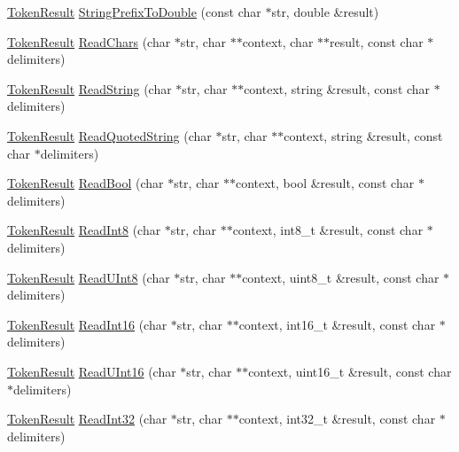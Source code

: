 \begin{DoxyCompactItemize}
\hyperlink{namespacemage_a2178ba2411db5912f41b2e7698c2037d}{Token\+Result} \hyperlink{namespacemage_a289525f635f3921024dd10dd6073a555}{String\+Prefix\+To\+Double} (const char $\ast$str, double \&result)
\item 
\hyperlink{namespacemage_a2178ba2411db5912f41b2e7698c2037d}{Token\+Result} \hyperlink{namespacemage_a5f2717cd5b7cfa9a43396e628e18a5d0}{Read\+Chars} (char $\ast$str, char $\ast$$\ast$context, char $\ast$$\ast$result, const char $\ast$delimiters)
\item 
\hyperlink{namespacemage_a2178ba2411db5912f41b2e7698c2037d}{Token\+Result} \hyperlink{namespacemage_aa4f9ae6b6aa815ab879d4ea1f0453172}{Read\+String} (char $\ast$str, char $\ast$$\ast$context, string \&result, const char $\ast$delimiters)
\item 
\hyperlink{namespacemage_a2178ba2411db5912f41b2e7698c2037d}{Token\+Result} \hyperlink{namespacemage_a0d98db3ab52b137bc811727c68659329}{Read\+Quoted\+String} (char $\ast$str, char $\ast$$\ast$context, string \&result, const char $\ast$delimiters)
\item 
\hyperlink{namespacemage_a2178ba2411db5912f41b2e7698c2037d}{Token\+Result} \hyperlink{namespacemage_af0a37dab7ba4c58335ff1e84d7279c1c}{Read\+Bool} (char $\ast$str, char $\ast$$\ast$context, bool \&result, const char $\ast$delimiters)
\item 
\hyperlink{namespacemage_a2178ba2411db5912f41b2e7698c2037d}{Token\+Result} \hyperlink{namespacemage_a53968b4c1082fa6042a1278a1fb628d1}{Read\+Int8} (char $\ast$str, char $\ast$$\ast$context, int8\+\_\+t \&result, const char $\ast$delimiters)
\item 
\hyperlink{namespacemage_a2178ba2411db5912f41b2e7698c2037d}{Token\+Result} \hyperlink{namespacemage_a357352c06cab6568efee62ddc9dcc6c9}{Read\+U\+Int8} (char $\ast$str, char $\ast$$\ast$context, uint8\+\_\+t \&result, const char $\ast$delimiters)
\item 
\hyperlink{namespacemage_a2178ba2411db5912f41b2e7698c2037d}{Token\+Result} \hyperlink{namespacemage_ae5362fb3f4d97bcecd70e5baeb22834f}{Read\+Int16} (char $\ast$str, char $\ast$$\ast$context, int16\+\_\+t \&result, const char $\ast$delimiters)
\item 
\hyperlink{namespacemage_a2178ba2411db5912f41b2e7698c2037d}{Token\+Result} \hyperlink{namespacemage_a8e94422a0e962b98b2555bc95c6eff4c}{Read\+U\+Int16} (char $\ast$str, char $\ast$$\ast$context, uint16\+\_\+t \&result, const char $\ast$delimiters)
\item 
\hyperlink{namespacemage_a2178ba2411db5912f41b2e7698c2037d}{Token\+Result} \hyperlink{namespacemage_a159df5ff8941b52ea523d0ebb4c2fd24}{Read\+Int32} (char $\ast$str, char $\ast$$\ast$context, int32\+\_\+t \&result, const char $\ast$delimiters)

\end{DoxyCompactItemize}

